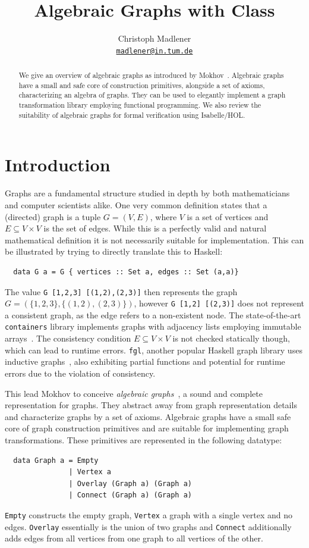 \documentclass{article}
\title{Algebraic Graphs with Class}
\author{
  Christoph Madlener\\
  \texttt{\href{mailto:madlener@in.tum.de}{madlener@in.tum.de}}
}
\newcommand{\hs}{\texttt}
\begin{document}
\maketitle
\begin{abstract}
  We give an overview of algebraic graphs as introduced by
  Mokhov~\cite{mokhov2017algebraic}. Algebraic graphs have a small and safe core
  of construction primitives, alongside a set of axioms, characterizing an
  algebra of graphs. They can be used to elegantly implement a graph
  transformation library employing functional programming. We also review the
  suitability of algebraic graphs for formal verification using Isabelle/HOL.
\end{abstract}

\section{Introduction}\label{sec:intro}
Graphs are a fundamental structure studied in depth by both mathematicians and
computer scientists alike. One very common definition states that a (directed)
graph is a tuple $G = (V,E)$, where $V$ is a set of vertices and $E \subseteq V
\times V$ is the set of edges. While this is a perfectly valid and natural
mathematical definition it is not necessarily suitable for implementation. This
can be illustrated by trying to directly translate this to Haskell:
\begin{verbatim}
  data G a = G { vertices :: Set a, edges :: Set (a,a)}
\end{verbatim}
The value \hs{G [1,2,3] [(1,2),(2,3)]} then represents the graph $G =
(\{1,2,3\}, \{(1,2),(2,3)\})$, however \hs{G [1,2] [(2,3)]} does not
represent a consistent graph, as the edge refers to a non-existent node.
The state-of-the-art \texttt{containers} library implements graphs with
adjacency lists employing immutable arrays~\cite{king1995dfs}. The
consistency condition $E \subseteq V \times V$ is not checked statically though,
which can lead to runtime errors. \texttt{fgl}, another popular Haskell graph
library uses inductive graphs~\cite{erwig2001inductive}, also exhibiting partial
functions and potential for runtime errors due to the violation of consistency.

This lead Mokhov to conceive \textit{algebraic
  graphs}~\cite{mokhov2017algebraic}, a sound and complete representation for
graphs. They abstract away from graph representation details and characterize
graphs by a set of axioms. Algebraic graphs have a small safe core of graph
construction primitives and are suitable for implementing graph transformations.
These primitives are represented in the following datatype:
\begin{verbatim}
  data Graph a = Empty
               | Vertex a
               | Overlay (Graph a) (Graph a)
               | Connect (Graph a) (Graph a)
\end{verbatim}
\hs{Empty} constructs the empty graph, \hs{Vertex} a graph with a single vertex
and no edges. \hs{Overlay} essentially is the union of two graphs and
\hs{Connect} additionally adds edges from all vertices from one graph to all
vertices of the other.
\end{document}
